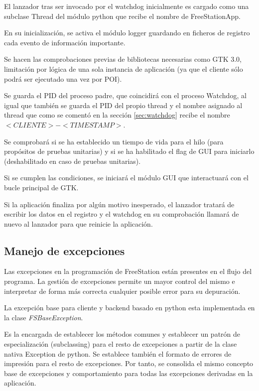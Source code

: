 El lanzador tras ser invocado por el watchdog inicialmente es cargado como una
subclase Thread del módulo python que recibe el nombre de FreeStationApp.

En su inicialización, se activa el módulo logger guardando en ficheros de
registro cada evento de información importante.

Se hacen las comprobaciones previas de bibliotecas necesarias como GTK 3.0,
limitación por lógica de una sola instancia de aplicación (ya que el cliente
sólo podrá ser ejecutado una vez por POI).

Se guarda el PID del proceso padre, que coincidirá con el proceso Watchdog, al
igual que también se guarda el PID del propio thread y el nombre asignado al
thread que como se comentó en la sección \ref{sec:watchdog} recibe el nombre
$<CLIENTE>-<TIMESTAMP>$.

Se comprobará si se ha establecido un tiempo de vida para el hilo (para
propósitos de pruebas unitarias) y si se ha habilitado el flag de GUI para
iniciarlo (deshabilitado en caso de pruebas unitarias).

Si se cumplen las condiciones, se iniciará el módulo GUI que interactuará con el
bucle principal de GTK.

Si la aplicación finaliza por algún motivo inesperado, el lanzador tratará de
escribir los datos en el registro y el watchdog en su comprobación llamará de
nuevo al lanzador para que reinicie la aplicación.

\newpage

\subsection{Manejo de excepciones}
\label{sec:exceptions}
Las excepciones en la programación de FreeStation están presentes en el flujo
del programa. La gestión de excepciones permite un mayor control del mismo e
interpretar de forma más correcta cualquier posible error para su depuración. 

La excepción base para cliente y backend basado en python esta implementada en
la clase \emph{FSBaseException}.

Es la encargada de establecer los métodos comunes y establecer un patrón de
especialización (subclassing) para el resto de excepciones a partir de la clase
nativa Exception de python. Se establece también el formato de errores de
impresión para el resto de excepciones. Por tanto, se consolida el mismo
concepto base de excepciones y comportamiento para todas las excepciones
derivadas en la aplicación.

